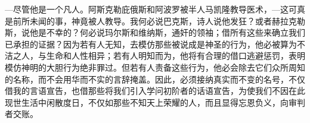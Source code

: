 \par

—尽管他是一个凡人。阿斯克勒庇俄斯和阿波罗被半人马凯隆教导医术，—这可真是前所未闻的事，神竟被人教导。我何必说巴克斯，诗人说他发狂？或者赫拉克勒斯，说他是不幸的？何必说玛尔斯和维纳斯，通奸的领袖；借所有这些来确立我们已承担的证据？因为若有人无知，去模仿那些被说成是神圣的行为，他必被算为不洁之人，与生命和人性相异；若有人明知而为，他将有合理的借口逃避惩罚，表明模仿神明的大胆行为绝非罪过。但若有人责备这些行为，他必会除去它们众所周知的名称，而不会用华而不实的言辞掩盖。因此，必须接纳真实而不变的名号，不仅借我的言语宣告，也借那些将我们引入学问初阶者的话语宣告，为使我们不因在此现世生活中闲散度日，不仅如那些不知天上荣耀的人，而且显得忘恩负义，向审判者交账。\par

